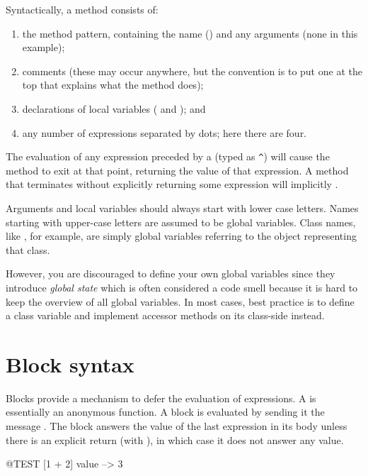 \documentclass[a4paper,10pt,twoside]{book}
\begin{document}
Syntactically, a method consists of:
\begin{enumerate}
  \item the method pattern, containing the name (\ie {}) and any arguments (none in this example);
  \item comments (these may occur anywhere, but the convention is to put one at the top that explains what the method does);
  \item declarations of local variables (\ie {} and ); and
  \item any number of expressions separated by dots; here there are four.
\end{enumerate}

The evaluation of any expression preceded by a \ct{^} (typed as \verb|^|) will cause the method to exit at that point, returning the value of that expression.
A method that terminates without explicitly returning some expression will implicitly  .

Arguments and local variables should always start with lower case letters.
Names starting with upper-case letters are assumed to be global variables.
Class names, like , for example, are simply global variables referring to the object representing that class.

However, you are discouraged to define your own global variables since they introduce \emph{global state} which is often considered a code smell because it is hard to keep the overview of all global variables.
In most cases, best practice is to define a class variable and implement accessor methods on its class-side instead.

\section{Block syntax}

Blocks provide a mechanism to defer the evaluation of expressions.
A  is essentially an anonymous function.
A block is evaluated by sending it the message .
The block answers the value of the last expression in its body unless there is an explicit return (with \ct{^}), in which case it does not answer any value.

\begin{code}{@TEST}
[1 + 2] value --> 3
\end{code}
\end{document}

